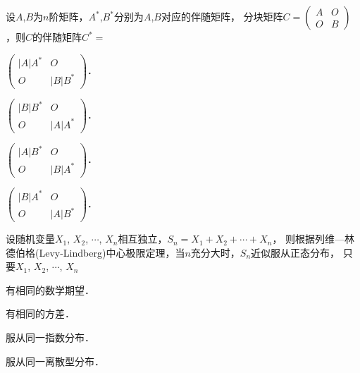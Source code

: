 \documentclass[plain,noanswer,medmath]{../../template/jnuexam}
\begin{document}
\begin{problem}
设$A$,$B$为$n$阶矩阵，$A^*$,$B^*$分别为$A$,$B$对应的伴随矩阵，
分块矩阵$C = \begin{pmatrix}
  A&O \\
  O&B
\end{pmatrix}$，则$C$的伴随矩阵$C^* = $\pickout{}
\begin{abcd}
\item $\begin{pmatrix}
  |A|A^*  & O \\
  O       & |B|B^* 
\end{pmatrix}$．
\item $\begin{pmatrix}
  |B|B^* & O \\
  O      & |A|A^*
\end{pmatrix}$．
\item $\begin{pmatrix}
  |A|B^* & O \\
  O      & |B|A^*
\end{pmatrix}$．
\item $\begin{pmatrix}
  |B|A^* & O \\
  O      & |A|B^*
\end{pmatrix}$．
\end{abcd}
\end{problem}




\begin{problem}
设随机变量$X_1$, $X_2$, $\cdots$, $X_n$相互独立，$S_n = X_1 + X_2 +  \cdots  + X_n$，
则根据列维—林德伯格(Levy-Lindberg)中心极限定理，当$n$充分大时，$S_n$近似服从正态分布，
只要$X_1$, $X_2$, $\cdots$, $X_n$\pickout{}
\begin{abcd}
\item 有相同的数学期望．
\item 有相同的方差．
\item 服从同一指数分布．
\item 服从同一离散型分布．
\end{abcd}
\end{problem}








\end{document}
